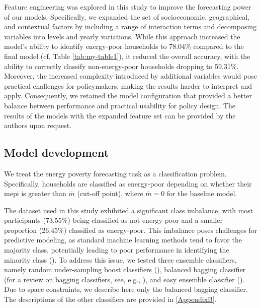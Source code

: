 \documentclass[preprint,authoryear,12pt]{elsarticle}
\newcommand{\citeTwo}[1]{(\cite{#1})}
\begin{document}
Feature engineering was explored in this study to improve the forecasting power of our models. Specifically, we expanded the set of socioeconomic, geographical, and contextual factors by including a range of interaction terms and decomposing variables into levels and yearly variations. While this approach increased the model's ability to identify energy-poor households to 78.04\% compared to the final model (cf. Table \ref{tab:my-table1}), it reduced the overall accuracy, with the ability to correctly classify non-energy-poor households dropping to 59.31\%. Moreover, the increased complexity introduced by additional variables would pose practical challenges for policymakers, making the results harder to interpret and apply. Consequently, we retained the model configuration that provided a better balance between performance and practical usability for policy design. The results of the models with the expanded feature set can be provided by the authors upon request.

\subsection{Model development} \label{Model_development}

We treat the energy poverty forecasting task as a classification problem. Specifically, households are classified as energy-poor depending on whether their \Gls{mepi} is greater than $\bar{m}$ (cut-off point), where $\bar{m} = 0$ for the baseline model. 

The dataset used in this study exhibited a significant class imbalance, with most participants (73.55\%) being classified as not energy-poor and a smaller proportion (26.45\%) classified as energy-poor. This imbalance poses challenges for predictive modeling, as standard machine learning methods tend to favor the majority class, potentially leading to poor performance in identifying the minority class \citeTwo{Pro00}. To address this issue, we tested three ensemble classifiers, namely random under-sampling boost classifiers \citeTwo{SKHN10}, balanced bagging classifier (for a review on bagging classifiers, see, e.g., \citet{GFBBH12}), and easy ensemble classifier \citeTwo{LWZ09}. Due to space constraints, we describe here only the balanced bagging classifier. The descriptions of the other classifiers are provided in  \ref{AppendixB}.
\end{document}
